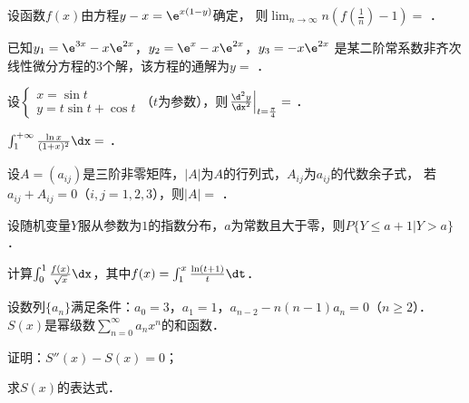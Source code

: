 \documentclass[plain,noanswer,medmath]{../../template/jnuexam}
\begin{document}


\begin{problem}
设函数$f(x)$由方程$y - x = \e^{x(1 - y)}$确定，
则$\lim_{n \to \infty} n\left(f\left(\frac{1}{n} \right) - 1 \right) =$ \fillin{}．
\end{problem}


\begin{problem}
已知$y_1 = \e^{3x} - x\e^{2x}$，$y_2 = \e^x - x\e^{2x}$，$y_3 = - x\e^{2x}$
是某二阶常系数非齐次线性微分方程的$3$个解，该方程的通解为$y =$ \fillin{}．
\end{problem}


\begin{problem}
设$\begin{cases}
  x = \sin t \\
  y = t\sin t + \cos t
\end{cases}$（$t$为参数），则$\left. \frac{\d^2y}{\dx^2} \right|_{t = \frac{\pi}{4}} =$ \fillin{}．
\end{problem}


\begin{problem}
$\int_1^{+\infty} \frac{\ln x}{(1 + x)^2}\dx =$ \fillin{}．
\end{problem}


\begin{problem}
设$A = (a_{ij})$是三阶非零矩阵，$|A|$为$A$的行列式，$A_{ij}$为$a_{ij}$的代数余子式，
若$a_{ij} + A_{ij} = 0$（$i,j = 1,2,3$），则$|A| =$ \fillin{}．
\end{problem}


\begin{problem}
设随机变量$Y$服从参数为$1$的指数分布，$a$为常数且大于零，\goodbreak 则$P\{Y \le a + 1|Y > a\}$ \fillin{}．
\end{problem}




\begin{problem}[points=10]
计算$\int_0^1\frac{f(x)}{\sqrt{x}}\dx$，其中$f(x) = \int_1^x \frac{\ln(t + 1)}{t}\dt$．
\end{problem}


\begin{problem}[points=10]
设数列$\{a_n\}$满足条件：$a_0 = 3$，$a_1 = 1$，$a_{n - 2} - n(n - 1)a_n = 0$（$n \ge 2$）．
$S(x)$是幂级数$\sum_{n = 0}^{\infty}a_n x^n$的和函数．\par
\begin{enumerate*}
\item 证明：$S''(x) - S(x) = 0$；
\item 求$S(x)$的表达式．
\end{enumerate*}
\end{problem}
\end{document}
